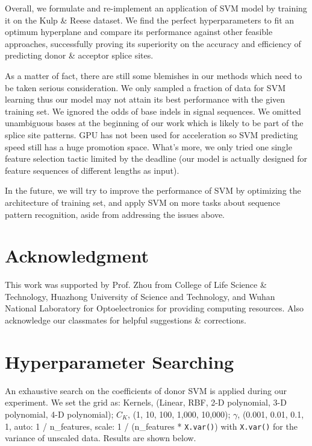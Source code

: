 \documentclass[journal,twoside]{IEEEtran}
\begin{document}
Overall, we formulate and re-implement an application of SVM model by training it on the Kulp \& Reese dataset. We find the perfect hyperparameters to fit an optimum hyperplane and compare its performance against other feasible approaches, successfully proving its superiority on the accuracy and efficiency of predicting donor \& acceptor splice sites. 

As a matter of fact, there are still some blemishes in our methods which need to be taken serious consideration. We only sampled a fraction of data for SVM learning thus our model may not attain its best performance with the given training set. We ignored the odds of base indels in signal sequences. We omitted unambiguous bases at the beginning of our work which is likely to be part of the splice site patterns. GPU has not been used for acceleration so SVM predicting speed still has a huge promotion space. What's more, we only tried one single feature selection tactic limited by the deadline (our model is actually designed for feature sequences of different lengths as input). 

In the future, we will try to improve the performance of SVM by optimizing the architecture of training set, and apply SVM on more tasks about sequence pattern recognition, aside from addressing the issues above. 

\section*{Acknowledgment}

This work was supported by Prof. Zhou from College of Life Science \& Technology, Huazhong University of Science and Technology, and Wuhan National Laboratory for Optoelectronics for providing computing resources. Also acknowledge our classmates for helpful suggestions \& corrections. 




\vspace{9cm}

\appendices
\section{Hyperparameter Searching}\label{A}

An exhaustive search on the coefficients of donor SVM is applied during our experiment. We set the grid as: Kernels, (Linear, RBF, 2-D polynomial, 3-D polynomial, 4-D polynomial); $C_K$, (1, 10, 100, 1,000, 10,000); $\gamma$, (0.001, 0.01, 0.1, 1, auto: 1 / n\_features, scale: 1 / (n\_features * \texttt{X.var()}) with \texttt{X.var()} for the variance of unscaled data. Results are shown below. 
\end{document}
